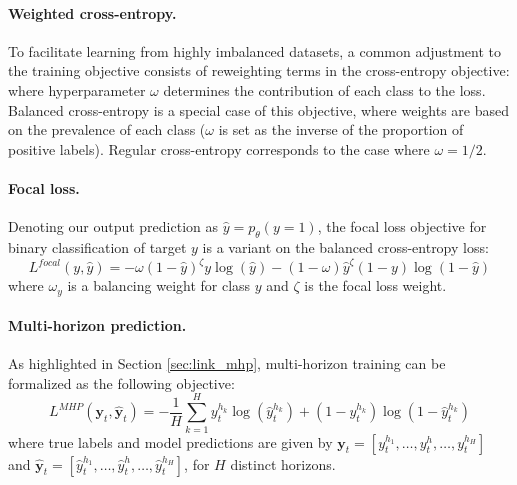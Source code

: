 \documentclass[nohyperref]{article}
\begin{document}
\paragraph{Weighted cross-entropy.} To facilitate learning from highly imbalanced datasets, a common adjustment to the training objective consists of reweighting terms in the cross-entropy objective:
\begin{equation*}
\end{equation*}
where hyperparameter $\omega$ determines the contribution of each class to the loss. Balanced cross-entropy is a special case of this objective, where weights are based on the prevalence of each class ($\omega$ is set as the inverse of the proportion of positive labels). Regular cross-entropy corresponds to the case where $\omega=1/2$.


\paragraph{Focal loss.} Denoting our output prediction as $\hat{y} = p_{\theta}(y = 1)$, the focal loss objective for binary classification of target $y$ is a variant on the balanced cross-entropy loss:
\begin{equation*}
    L^{focal}(y, \hat{y}) = - \omega (1-\hat{y})^{\zeta}y\log (\hat{y}) - (1-\omega) \hat{y}^{\zeta}(1-y)\log (1-\hat{y})
\end{equation*}
where $\omega_{y}$ is a balancing weight for class $y$ and $\zeta$ is the focal loss weight.


\paragraph{Multi-horizon prediction.} As highlighted in Section \ref{sec:link_mhp}, multi-horizon training can be formalized as the following objective:
    \begin{equation*}
            L^{MHP}(\mathbf{y}_{t},\hat{\mathbf{y}}_{t}) = -\frac{1}{H}\sum_{k=1}^H y^{h_k}_{t}\log(\hat{y}^{h_k}_{t}) + (1-y^{h_k}_{t})\log(1 - \hat{y}^{h_k}_{t})
    \end{equation*}
where true labels and model predictions are given by $\mathbf{y}_{t} = [y^{h_1}_{t}, \ldots, y^{h}_{t}, \ldots, y^{h_H}_{t}]$ and $\hat{\mathbf{y}}_{t} = [\hat{y}^{h_1}_{t}, \ldots, \hat{y}^{h}_{t}, \ldots, \hat{y}^{h_H}_{t}]$, for $H$ distinct horizons.
\end{document}
